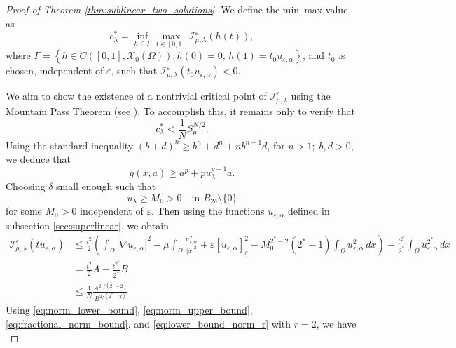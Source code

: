 \documentclass[11pt]{article}
\newcommand{\al} {\alpha}
\newcommand{\de} {\delta}
\newcommand{\om} {\Omega}
\newcommand{\X}{\mathcal{X}_0} %
\newcommand{\Ie}{\mathcal{I}_{\mu,\lambda}^{\varepsilon}} %
\begin{document}
\begin{proof}[Proof of Theorem \ref{thm:sublinear_two_solutions}]
We define the min–max value as
\begin{equation*}
c^*_{\lambda} = \inf_{h \in \Gamma} \max_{t \in [0,1]} \Ie(h(t)),
\end{equation*}
where $\Gamma = \left\{ h \in C([0,1], \X(\om)) : h(0) = 0,\, h(1) = t_0 u_{\varepsilon,\al} \right\}$, and \( t_0 \) is chosen, independent of $\varepsilon$, such that $\Ie(t_0 u_{\varepsilon,\al}) < 0$.

We aim to show the existence of a nontrivial critical point of \( \Ie \) using the Mountain Pass Theorem (see \cite[Theorem $1$]{ghoussoub_mountain_pass_theorem}). To accomplish this, it remains only to verify that
\begin{equation*}
c^*_{\lambda} < \frac{1}{N} S_{\mu}^{N/2}.
\end{equation*}
Using the standard inequality $(b + d)^n \geq b^n + d^n + n b^{n-1} d$, for $n > 1; \; b,d > 0$, 
we deduce that
\begin{equation*}
g(x, a) \geq a^p + p  u_\lambda^{p-1} a.
\end{equation*}
Choosing \( \delta \) small enough such that
\[
u_{\lambda} \geq M_0 > 0 \quad \text{in } B_{2 \de} \setminus \{0\}
\]
for some $M_0>0$ independent of $\varepsilon$. Then using the functions $u_{\varepsilon,\al}$ defined in subsection \ref{sec:superlinear}, we obtain
\begin{equation*} 
\begin{aligned}
\Ie(t u_{\varepsilon,\al}) &\leq \frac{t^2}{2} \left( \int_{\Omega} |\nabla u_{\varepsilon,\al}|^2 - \mu \int_{\Omega} \frac{u_{\varepsilon,\al}^2}{|x|^2} + \varepsilon[u_{\varepsilon,\al}]_s^2 - M_0^{2^*-2}(2^*-1) \int_{\Omega} u_{\varepsilon,\al}^2 \, dx \right) 
- \frac{t^{2^*}}{2^*} \int_{\Omega} u_{\varepsilon,\al}^{2^*} \, dx\\
& = \frac{t^2}{2}A - \frac{t^{2^*}}{2^*}B\\
& \leq \frac{1}{N}   \frac{A^{2^* / (2^* - 2)}}{B^{2 / (2^* - 2)}}
\end{aligned}
\end{equation*}
Using \eqref{eq:norm_lower_bound}, \eqref{eq:norm_upper_bound}, \eqref{eq:fractional_norm_bound}, and \eqref{eq:lower_bound_norm_r} with $r = 2$, we have
\begin{equation*} 

\end{equation*}
\end{proof}
\end{document}
